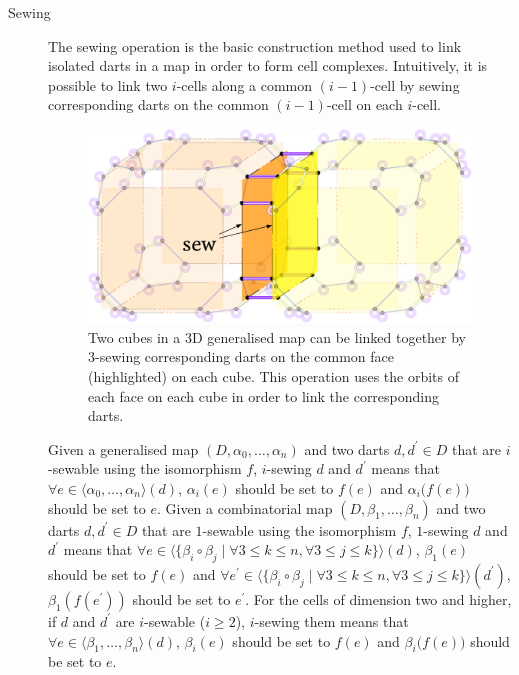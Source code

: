 \begin{description}
\item[Sewing]
The sewing operation is the basic construction method used to link isolated darts in a map in order to form cell complexes.
Intuitively, it is possible to link two $i$-cells along a common $(i-1)$-cell by sewing corresponding darts on the common $(i-1)$-cell on each $i$-cell.
\begin{figure}[tbp]
\centering
\includegraphics[width=\linewidth]{figs/3-sew}
\caption[3-sewing two cubes]{Two cubes in a 3D generalised map can be linked together by 3-sewing corresponding darts on the common face (highlighted) on each cube. This operation uses the orbits of each face on each cube in order to link the corresponding darts.}
\end{figure}
Given a generalised map $(D,\alpha_{0},\ldots,\alpha_{n})$ and two darts $d,d^\prime \in D$ that are $i$-sewable using the isomorphism $f$, $i$-sewing $d$ and $d^\prime$ means that $\forall e \in \langle\alpha_0, \ldots, \alpha_n\rangle(d)$, $\alpha_i(e)$ should be set to $f(e)$ and $\alpha_i\big(f(e)\big)$ should be set to $e$.
Given a combinatorial map $(D, \beta_{1}, \ldots, \beta_{n})$ and two darts $d,d^\prime \in D$ that are $1$-sewable using the isomorphism $f$, $1$-sewing $d$ and $d^\prime$ means that $\forall e \in \langle \{\beta_i\circ \beta_j \mid \forall 3 \leq k \leq n, \forall 3 \leq j \leq k\} \rangle(d)$, $\beta_1(e)$ should be set to $f(e)$ and $\forall e^\prime \in \langle \{\beta_i\circ \beta_j \mid \forall 3 \leq k \leq n, \forall 3 \leq j \leq k\} \rangle(d^\prime)$, $\beta_1(f(e^\prime))$ should be set to $e^\prime$.
For the cells of dimension two and higher, if $d$ and $d^\prime$ are $i$-sewable ($i \geq 2$), $i$-sewing them means that $\forall e \in \langle\beta_{1}, \ldots, \beta_{n}\rangle(d)$, $\beta_i(e)$ should be set to $f(e)$ and $\beta_i\big(f(e)\big)$ should be set to $e$.

\end{description}

